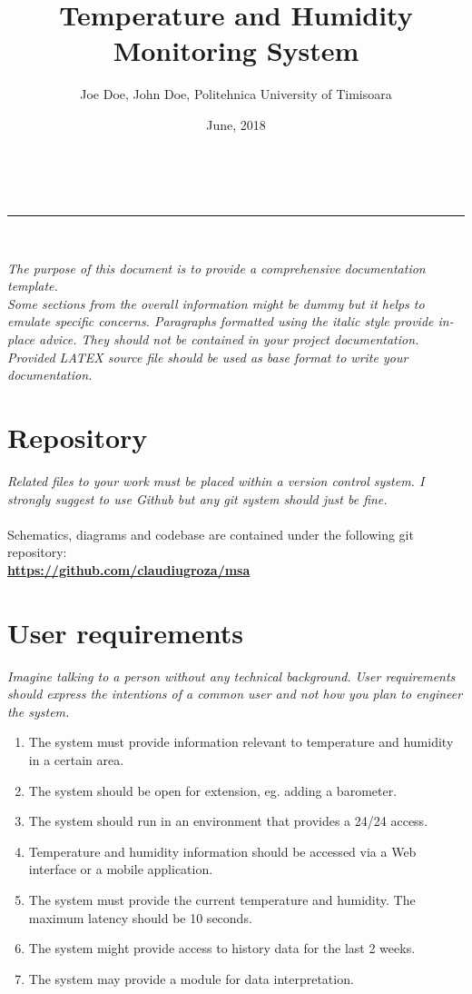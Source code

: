\documentclass[a4paper,11pt]{article}
\makeatletter
\newcommand{\divider}{\rule{\linewidth}{0.5pt}}
\renewcommand{\maketitle}{
\begin{center}
\vspace{2ex}
{\huge \textsc{\@title}}
\vspace{1ex}
\\
\divider\\
\@author \hfill \@date
\vspace{4ex}
\end{center}
}
\makeatother
\begin{document}
\title{Temperature and Humidity Monitoring System}

\author{Joe Doe, John Doe, Politehnica University of Timisoara}

\date{June, 2018}

\maketitle


\textit{The purpose of this document is to provide a comprehensive documentation template.\\
Some sections from the overall information might be dummy but it helps to emulate specific concerns.
Paragraphs formatted using the italic style provide in-place advice. They should not be contained in your project documentation.
Provided LATEX source file should be used as base format to write your documentation.
}

\section{Repository}
\textit{Related files to your work must be placed within a version control system. I strongly suggest to use Github but any git system should just be fine.}\\\\
Schematics, diagrams and codebase are contained under the following git repository:\\
\textbf{\url{https://github.com/claudiugroza/msa}}

\section{User requirements}
\textit{Imagine talking to a person without any technical background. User requirements should express the intentions of a common user and not how you plan to engineer the system.}

\begin{enumerate}  
\item The system must provide information relevant to temperature and humidity in a certain area.
\item The system should be open for extension, eg. adding a barometer.
\item The system should run in an environment that provides a 24/24 access.
\item Temperature and humidity information should be accessed via a Web interface or a mobile application.
\item The system must provide the current temperature and humidity. The maximum
latency should be 10 seconds.
\item The system might provide access to history data for the last 2 weeks.
\item The system may provide a module for data interpretation.
\end{enumerate}
\end{document}
